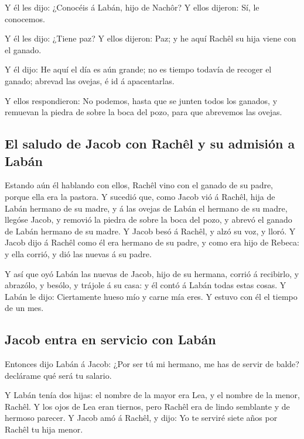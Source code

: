  Y él les dijo: ¿Conocéis á Labán, hijo de Nachôr? Y ellos
dijeron: Sí, le conocemos.

 Y él les dijo: ¿Tiene paz? Y ellos dijeron: Paz; y he
aquí Rachêl su hija viene con el ganado.

 Y él dijo: He aquí el día es aún grande; no es tiempo
todavía de recoger el ganado; abrevad las ovejas, é id á apacentarlas.

 Y ellos respondieron: No podemos, hasta que se junten
todos los ganados, y remuevan la piedra de sobre la boca del pozo, para
que abrevemos las ovejas.

\hypertarget{el-saludo-de-jacob-con-rachuxeal-y-su-admisiuxf3n-a-labuxe1n}{%
\subsection{El saludo de Jacob con Rachêl y su admisión a
Labán}\label{el-saludo-de-jacob-con-rachuxeal-y-su-admisiuxf3n-a-labuxe1n}}

 Estando aún él hablando con ellos, Rachêl vino con el
ganado de su padre, porque ella era la pastora.  Y
sucedió que, como Jacob vió á Rachêl, hija de Labán hermano de su madre,
y á las ovejas de Labán el hermano de su madre, llegóse Jacob, y removió
la piedra de sobre la boca del pozo, y abrevó el ganado de Labán hermano
de su madre.  Y Jacob besó á Rachêl, y alzó su voz, y
lloró.  Y Jacob dijo á Rachêl como él era hermano de su
padre, y como era hijo de Rebeca: y ella corrió, y dió las nuevas á su
padre.

 Y así que oyó Labán las nuevas de Jacob, hijo de su
hermana, corrió á recibirlo, y abrazólo, y besólo, y trájole á su casa:
y él contó á Labán todas estas cosas.  Y Labán le dijo:
Ciertamente hueso mío y carne mía eres. Y estuvo con él el tiempo de un
mes.

\hypertarget{jacob-entra-en-servicio-con-labuxe1n}{%
\subsection{Jacob entra en servicio con
Labán}\label{jacob-entra-en-servicio-con-labuxe1n}}

 Entonces dijo Labán á Jacob: ¿Por ser tú mi hermano, me
has de servir de balde? declárame qué será tu salario.

 Y Labán tenía dos hijas: el nombre de la mayor era Lea,
y el nombre de la menor, Rachêl.  Y los ojos de Lea eran
tiernos, pero Rachêl era de lindo semblante y de hermoso parecer.
 Y Jacob amó á Rachêl, y dijo: Yo te serviré siete años
por Rachêl tu hija menor.

